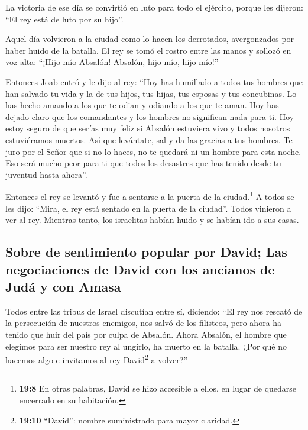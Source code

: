  La victoria de ese día se convirtió en luto para todo el
ejército, porque les dijeron: ``El rey está de luto por su hijo''.

 Aquel día volvieron a la ciudad como lo hacen los
derrotados, avergonzados por haber huido de la batalla. 
El rey se tomó el rostro entre las manos y sollozó en voz alta: ``¡Hijo
mío Absalón! Absalón, hijo mío, hijo mío!''

 Entonces Joab entró y le dijo al rey: ``Hoy has humillado
a todos tus hombres que han salvado tu vida y la de tus hijos, tus
hijas, tus esposas y tus concubinas.  Lo has hecho amando
a los que te odian y odiando a los que te aman. Hoy has dejado claro que
los comandantes y los hombres no significan nada para ti. Hoy estoy
seguro de que serías muy feliz si Absalón estuviera vivo y todos
nosotros estuviéramos muertos.  Así que levántate, sal y
da las gracias a tus hombres. Te juro por el Señor que si no lo haces,
no te quedará ni un hombre para esta noche. Eso será mucho peor para ti
que todos los desastres que has tenido desde tu juventud hasta ahora''.

 Entonces el rey se levantó y fue a sentarse a la puerta
de la ciudad.\footnote{\textbf{19:8} En otras palabras, David se hizo
  accesible a ellos, en lugar de quedarse encerrado en su habitación.} A
todos se les dijo: ``Mira, el rey está sentado en la puerta de la
ciudad''. Todos vinieron a ver al rey. Mientras tanto, los israelitas
habían huido y se habían ido a sus casas.

\hypertarget{sobre-de-sentimiento-popular-por-david-las-negociaciones-de-david-con-los-ancianos-de-juduxe1-y-con-amasa}{%
\subsection{Sobre de sentimiento popular por David; Las negociaciones de
David con los ancianos de Judá y con
Amasa}\label{sobre-de-sentimiento-popular-por-david-las-negociaciones-de-david-con-los-ancianos-de-juduxe1-y-con-amasa}}

 Todos entre las tribus de Israel discutían entre sí,
diciendo: ``El rey nos rescató de la persecución de nuestros enemigos,
nos salvó de los filisteos, pero ahora ha tenido que huir del país por
culpa de Absalón.  Ahora Absalón, el hombre que elegimos
para ser nuestro rey al ungirlo, ha muerto en la batalla. ¿Por qué no
hacemos algo e invitamos al rey David\footnote{\textbf{19:10} ``David'':
  nombre suministrado para mayor claridad.} a volver?''

